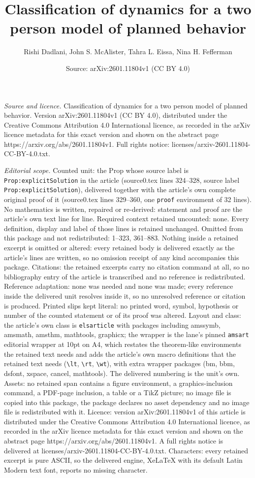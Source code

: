 \documentclass[10pt,a4paper]{amsart}
\title[Classification of dynamics for a two person model of planned]{Classification of dynamics for a two person model of planned behavior}
\author{Rishi Dadlani, John S. McAlister, Tahra L. Eissa, Nina H. Fefferman}
\date{Source: arXiv:2601.11804v1 (CC BY 4.0)}
\begin{document}
\maketitle

\noindent\emph{Source and licence.} Classification of dynamics for a two person model of planned behavior. Version arXiv:2601.11804v1 (CC BY 4.0), distributed under the Creative Commons Attribution 4.0 International licence, as recorded in the arXiv licence metadata for this exact version and shown on the abstract page https://arxiv.org/abs/2601.11804v1. Full rights notice: licenses/arxiv-2601.11804-CC-BY-4.0.txt.\par\smallskip

\noindent\textit{Editorial scope.} Counted unit: the Prop whose source label is \texttt{Prop:explicitSolution} in the article (source0.tex lines 324--328, source label \texttt{Prop:explicitSolution}), delivered together with the article's own complete original proof of it (source0.tex lines 329--360, one \texttt{proof} environment of 32 lines). No mathematics is written, repaired or re-derived: statement and proof are the article's own text line for line. Required context retained uncounted: none. Every definition, display and label of those lines is retained unchanged. Omitted from this package and not redistributed: 1--323, 361--883. Nothing inside a retained excerpt is omitted or altered: every retained body is delivered exactly as the article's lines are written, so no omission receipt of any kind accompanies this package. Citations: the retained excerpts carry no citation command at all, so no bibliography entry of the article is transcribed and no reference is redistributed. Reference adaptation: none was needed and none was made; every reference inside the delivered unit resolves inside it, so no unresolved reference or citation is produced. Printed slips kept literal: no printed word, symbol, hypothesis or number of the counted statement or of its proof was altered. Layout and class: the article's own class is \texttt{elsarticle} with packages including amssymb, amsmath, amsthm, mathtools, graphicx; the wrapper is the lane's pinned \texttt{amsart} editorial wrapper at 10pt on A4, which restates the theorem-like environments the retained text needs and adds the article's own macro definitions that the retained text needs (\texttt{\textbackslash lt}, \texttt{\textbackslash rt}, \texttt{\textbackslash wt}), with extra wrapper packages (bm, bbm, dsfont, xspace, cancel, mathtools). The delivered numbering is the unit's own. Assets: no retained span contains a figure environment, a graphics-inclusion command, a PDF-page inclusion, a table or a TikZ picture; no image file is copied into this package, the package declares no asset dependency and no image file is redistributed with it. Licence: version arXiv:2601.11804v1 of this article is distributed under the Creative Commons Attribution 4.0 International licence, as recorded in the arXiv licence metadata for this exact version and shown on the abstract page https://arxiv.org/abs/2601.11804v1. A full rights notice is delivered at licenses/arxiv-2601.11804-CC-BY-4.0.txt. Characters: every retained excerpt is pure ASCII, so the delivered engine, XeLaTeX with its default Latin Modern text font, reports no missing character.
\end{document}
